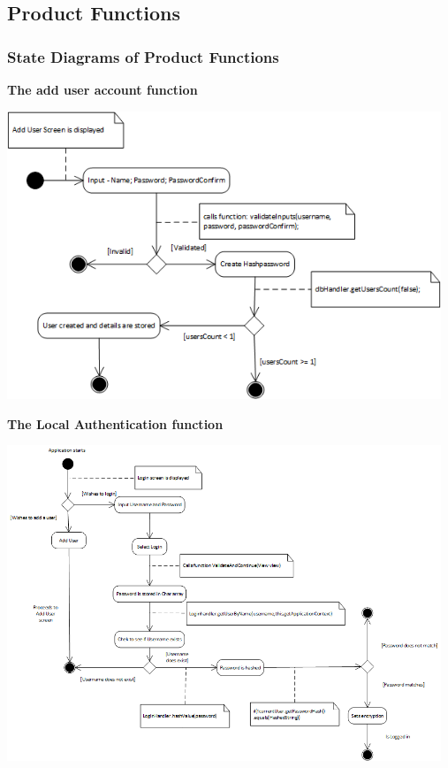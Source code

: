\subsection{Product Functions}
\subsubsection{State Diagrams of Product Functions}

\begin{center}
\textbf{The add user account function\\}
\end{center}
 \includegraphics[width=13cm]{diagrams/StateDiagrams/AddUserStateDiagram.png}
\textbf{\\}
\begin{center}
\textbf{The Local Authentication function\\}
\end{center}
 \includegraphics[width=13cm]{diagrams/StateDiagrams/LocalAuthenticationStateDiagram.png}
